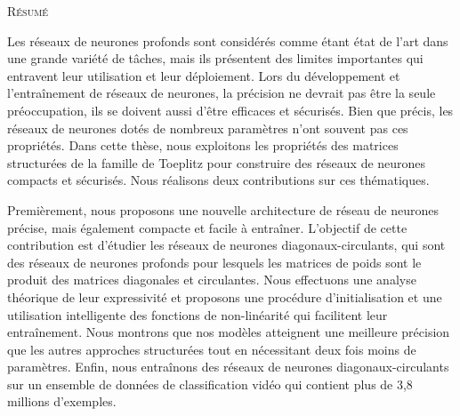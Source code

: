 \begin{center}
  {\Huge \textsc{Résumé}}
\end{center}
%
\noindent
Les réseaux de neurones profonds sont considérés comme étant état de l'art dans une grande variété de tâches, mais ils présentent des limites importantes qui entravent leur utilisation et leur déploiement.
Lors du développement et l'entraînement de réseaux de neurones, la précision ne devrait pas être la seule préoccupation, ils se doivent aussi d'être efficaces et sécurisés.
Bien que précis, les réseaux de neurones dotés de nombreux paramètres n'ont souvent pas ces propriétés.
Dans cette thèse, nous exploitons les propriétés des matrices structurées de la famille de Toeplitz pour construire des réseaux de neurones compacts et sécurisés.
Nous réalisons deux contributions sur ces thématiques.


Premièrement, nous proposons une nouvelle architecture de réseau de neurones précise, mais également compacte et facile à entraîner. 
L'objectif de cette contribution est d'étudier les réseaux de neurones diagonaux-circulants, qui sont des réseaux de neurones profonds pour lesquels les matrices de poids sont le produit des matrices diagonales et circulantes.
Nous effectuons une analyse théorique de leur expressivité et proposons une procédure d'initialisation et une utilisation intelligente des fonctions de non-linéarité qui facilitent leur entraînement.
Nous montrons que nos modèles atteignent une meilleure précision que les autres approches structurées tout en nécessitant deux fois moins de paramètres.
Enfin, nous entraînons des réseaux de neurones diagonaux-circulants sur un ensemble de données de classification vidéo qui contient plus de 3,8 millions d'exemples.


